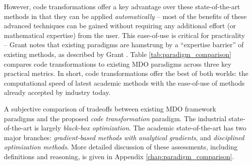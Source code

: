 However, code transformations offer a key advantage over these state-of-the-art methods in that they can be applied \textit{automatically} -- most of the benefits of these advanced techniques can be gained without requiring any additional effort (or mathematical expertise) from the user. This ease-of-use is critical for practicality -- Grant notes that existing paradigms are hamstrung by a ``expertise barrier'' of existing methods, as described by Grant \cite{grant_disciplined_2006}. Table \ref{tab:paradigm_comparison} compares code transformations to existing MDO paradigms across three key practical metrics. In short, code transformations offer the best of both worlds: the computational speed of latest academic methods with the ease-of-use of methods already accepted by industry today.

\begin{table}[H]



    \newcommand{\bad}{\textcolor{q1}{\large\textbf{Limited}}}
    \newcommand{\good}{\textcolor{q2}{\large\textbf{Good}}}
    \newcommand{\great}{\textcolor{q3}{\large\textbf{Great}}}
    \newcommand{\best}{\textcolor{q4}{\large\textbf{Best}}}

    \centering
    \caption{A subjective comparison of tradeoffs between existing MDO framework paradigms and the proposed \textit{code transformation} paradigm. The industrial state-of-the-art is largely \textit{black-box optimization}. The academic state-of-the-art has two major branches: \textit{gradient-based methods with analytical gradients}, and \textit{disciplined optimization methods}. More detailed discussion of these assessments, including definitions and reasoning, is given in Appendix \ref{chap:paradigm_comparison}.}
    \label{tab:paradigm_comparison}


\end{table}

